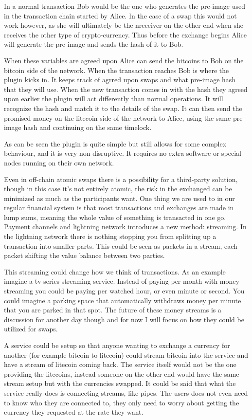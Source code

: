 In a normal transaction Bob would be the one who generates the pre-image used 
in the transaction chain started by Alice. In the case of a swap this would not 
work however, as she will ultimately be the nreceiver on the other end
when she receives the other type of crypto-currency. Thus before the exchange
begins Alice will generate the pre-image and sends the hash of it to Bob.

When these variables are agreed upon Alice can send the bitcoins to Bob on the
bitcoin side of the network. When the transaction reaches Bob is where the plugin
kicks in. It keeps track of agrred upon swaps and what pre-image hash that they
will use. When the new transaction comes in with the hash they agreed upon earlier
the plugin will act differently than normal operations. It will recognize the hash
and match it to the details of the swap. It can then send the promised money on 
the litecoin side of the network to Alice, using the same pre-image hash and 
continuing on the same timelock. 

As can be seen the plugin is quite simple but still allows for some complex 
behaviour, and it is very non-disruptive. It requires no extra software or special
nodes running on their own network. 

Even in off-chain atomic swaps there is a possibility for a third-party solution, 
though in this case it's not entirely atomic, the risk in the exchanged can be 
minimized as much as the participants want. One thing we are used to in our regular
financial system is that most transactions and exchanges are made in lump sums, meaning 
the whole value of something is transacted in one go. Payment channels and lightning network 
introduces a new method: streaming. In the lightning network there is nothing stopping you 
from splitting up a transaction into smaller parts. This could be seen
as packets in a stream, each packet shifting the value balance between two parties. 

This streaming could change how we think of transactions. As an example imagine a tv-series 
streaming service. Instead of paying per month with money streaming you could be paying per 
watched hour, or even minute or second. You could imagine a parking space that automatically
withdraws money per minute that you are parked in that spot. The future of these money streams 
is a discussion for another day though and for now I will focus on how they could be utilized 
for swaps.

A service could be setup so that anyone wanting to exchange a currency for 
another (for example bitcoin to litecoin) could stream bitcoin into the service and have 
a stream of litecoin coming back. The service itself would not be the one providing 
the litecoins, instead someone on the other end would have the same stream setup
but with the currencies swapped. It could be said that what the service really does is 
connecting streams, like pipes. The users does not even need to know who they are 
connected to, they only need to worry about getting the currency they requested 
at the rate they want.

